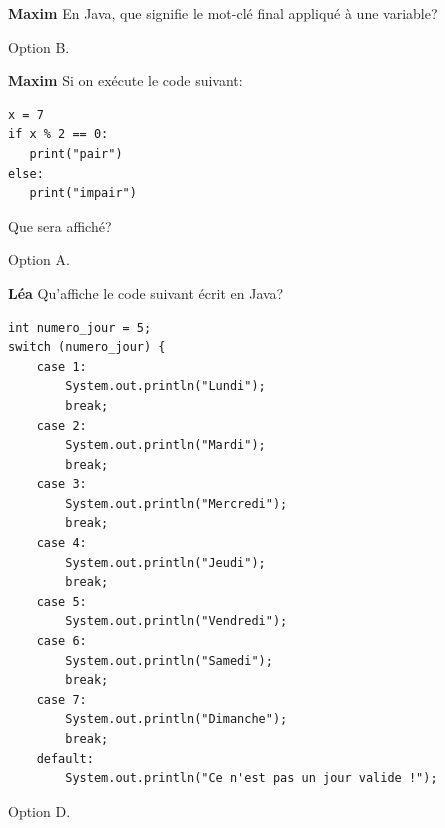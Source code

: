 
\begin{Exercice}[10 minutes]\textbf{Maxim}
En Java, que signifie le mot-clé final appliqué à une variable?

 \begin{solution}
Option B. 
 \end{solution}

\end{Exercice}

\begin{Exercice}[10 minutes]\textbf{Maxim}
Si on exécute le code suivant:

\begin{lstlisting}[style=pythonstyle]
x = 7 
if x % 2 == 0: 
   print("pair") 
else: 
   print("impair") 
\end{lstlisting}
Que sera affiché?


\begin{solution}
Option A. 
\end{solution}
\end{Exercice}

\begin{Exercice}[10 minutes]\textbf{Léa}
Qu'affiche le code suivant écrit en Java?

\begin{lstlisting}[style=javastyle]
int numero_jour = 5;
switch (numero_jour) {
    case 1:                
        System.out.println("Lundi");
        break;
    case 2:
        System.out.println("Mardi");
        break;
    case 3:
        System.out.println("Mercredi");
        break;
    case 4:
        System.out.println("Jeudi");
        break;            
    case 5:                
        System.out.println("Vendredi");
    case 6:                
        System.out.println("Samedi");
        break;            
    case 7:                
        System.out.println("Dimanche");
        break;            
    default:                
        System.out.println("Ce n'est pas un jour valide !");
\end{lstlisting}


\begin{solution}
Option D. 
\end{solution}
\end{Exercice}

